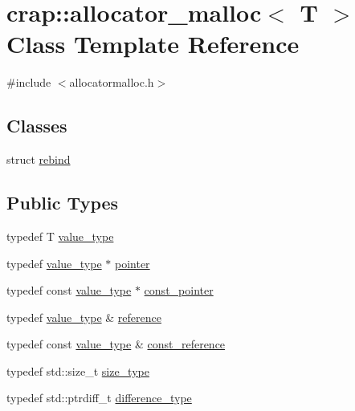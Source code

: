 \hypertarget{classcrap_1_1allocator__malloc}{\section{crap\-:\-:allocator\-\_\-malloc$<$ T $>$ Class Template Reference}
\label{classcrap_1_1allocator__malloc}
}


{\ttfamily \#include $<$allocatormalloc.\-h$>$}

\subsection*{Classes}
\begin{DoxyCompactItemize}
\item 
struct \hyperlink{structcrap_1_1allocator__malloc_1_1rebind}{rebind}
\end{DoxyCompactItemize}
\subsection*{Public Types}
\begin{DoxyCompactItemize}
\item 
typedef T \hyperlink{classcrap_1_1allocator__malloc_a2249a8433a4a8e146ea68bd1177ba758}{value\-\_\-type}
\item 
typedef \hyperlink{classcrap_1_1allocator__malloc_a2249a8433a4a8e146ea68bd1177ba758}{value\-\_\-type} $\ast$ \hyperlink{classcrap_1_1allocator__malloc_a2bc7f3c9513f482c998d0241fff499a4}{pointer}
\item 
typedef const \hyperlink{classcrap_1_1allocator__malloc_a2249a8433a4a8e146ea68bd1177ba758}{value\-\_\-type} $\ast$ \hyperlink{classcrap_1_1allocator__malloc_acdfb7a73142fadd4d2da1260a41e0c8b}{const\-\_\-pointer}
\item 
typedef \hyperlink{classcrap_1_1allocator__malloc_a2249a8433a4a8e146ea68bd1177ba758}{value\-\_\-type} \& \hyperlink{classcrap_1_1allocator__malloc_a8b7fbb7f3ec9ce7edac2c9e544739a98}{reference}
\item 
typedef const \hyperlink{classcrap_1_1allocator__malloc_a2249a8433a4a8e146ea68bd1177ba758}{value\-\_\-type} \& \hyperlink{classcrap_1_1allocator__malloc_ab8c48878eb30f1a5ffc7e7f55177731e}{const\-\_\-reference}
\item 
typedef std\-::size\-\_\-t \hyperlink{classcrap_1_1allocator__malloc_ad32425bf529526a4335179cc55a79a83}{size\-\_\-type}
\item 
typedef std\-::ptrdiff\-\_\-t \hyperlink{classcrap_1_1allocator__malloc_ae101aa693d7df298314afd6fc0784900}{difference\-\_\-type}
\end{DoxyCompactItemize}
